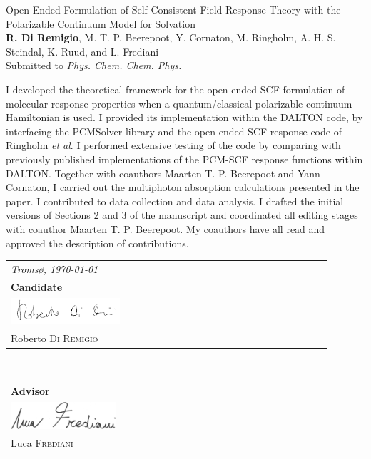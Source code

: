 \documentclass[notitlepage,a4paper,11pt,dvipsnames]{article}
\begin{document}
\begin{tcolorbox}
  {\small
  \textsf{Open-Ended Formulation of Self-Consistent Field Response Theory with
  the Polarizable Continuum Model for Solvation
  }
  \\
  \textbf{R. Di Remigio}, M. T. P. Beerepoot, Y. Cornaton, M. Ringholm,
  A. H. S. Steindal, K. Ruud, and L. Frediani
  \\
  Submitted to \textit{Phys. Chem. Chem. Phys.}
  }
\end{tcolorbox}
I developed the theoretical framework for the open-ended SCF formulation
of molecular response properties when a quantum/classical polarizable continuum
Hamiltonian is used.
I provided its implementation within the DALTON code, by interfacing the
PCMSolver library and the open-ended SCF response code of Ringholm \emph{et al}.
I performed extensive testing of the code by comparing with previously
published implementations of the PCM-SCF response functions within
DALTON.
Together with coauthors Maarten T. P. Beerepoot and Yann Cornaton, I carried out
the multiphoton absorption calculations presented in the paper. I contributed
to data collection and data analysis.
I drafted the initial versions of Sections 2 and 3 of the manuscript and coordinated all
editing stages with coauthor Maarten T. P. Beerepoot.
My coauthors have all read and approved the description of contributions.

\begin{flushright}
    \begin{tabular}{m{5cm}}
      \textit{Troms{\o}, \today} \\
        {\small \textbf{Candidate}} \\
      \includegraphics[width=0.35\textwidth]{gfx/signature.png} \\
        \hline
        {\small Roberto \textsc{Di Remigio}} \\
    \end{tabular}
    \\
    \begin{tabular}{m{5cm}}
        {\small \textbf{Advisor} }
        \\
      \includegraphics[width=0.3\textwidth]{gfx/LucaSignature.png} \\
        \hline
        {\small Luca \textsc{Frediani}} \\
    \end{tabular}
\end{flushright}
\end{document}
